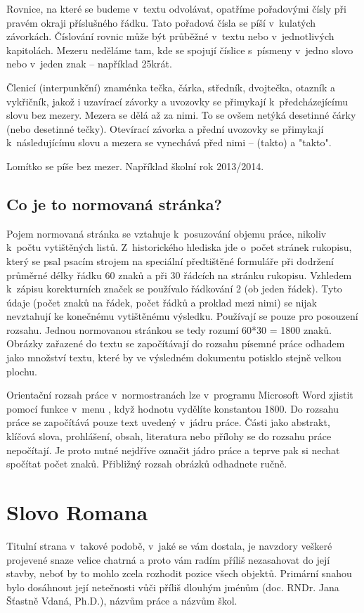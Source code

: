 \documentclass{template/socthesis}
\begin{document}
Rovnice, na které se budeme v~textu odvolávat, opatříme pořadovými čísly při pravém okraji příslušného řádku.
Tato pořadová čísla se píší v~kulatých závorkách.
Číslování rovnic může být průběžné v~textu nebo v~jednotlivých kapitolách.
Mezeru neděláme tam, kde se spojují číslice s~písmeny v~jedno slovo nebo v~jeden znak – například 25krát.

Členicí (interpunkční) znaménka tečka, čárka, středník, dvojtečka, otazník a vykřičník, jakož i uzavírací závorky a uvozovky se přimykají k~předcházejícímu slovu bez mezery.
Mezera se dělá až za nimi.
To se ovšem netýká desetinné čárky (nebo desetinné tečky).
Otevírací závorka a přední uvozovky se přimykají k~následujícímu slovu a mezera se vynechává před nimi – (takto) a "takto".

Lomítko se píše bez mezer.
Například školní rok 2013/2014.

\section{Co je to normovaná stránka?}
Pojem normovaná stránka se vztahuje k~posuzování objemu práce, nikoliv k~počtu vytištěných listů.
Z~historického hlediska jde o~počet stránek rukopisu, který se psal psacím strojem na speciální předtištěné formuláře při dodržení průměrné délky řádku 60 znaků a při 30 řádcích na stránku rukopisu.
Vzhledem k~zápisu korekturních značek se používalo řádkování 2 (ob jeden řádek).
Tyto údaje (počet znaků na řádek, počet řádků a proklad mezi nimi) se nijak nevztahují ke konečnému vytištěnému výsledku.
Používají se pouze pro posouzení rozsahu.
Jednou normovanou stránkou se tedy rozumí 60*30 = 1800 znaků.
Obrázky zařazené do textu se započítávají do rozsahu písemné práce odhadem jako množství textu, které by ve výsledném dokumentu potisklo stejně velkou plochu.

Orientační rozsah práce v~normostranách lze v~programu Microsoft Word zjistit pomocí funkce  v~menu , když hodnotu  vydělíte konstantou 1800.
Do rozsahu práce se započítává pouze text uvedený v~jádru práce.
Části jako abstrakt, klíčová slova, prohlášení, obsah, literatura nebo přílohy se do rozsahu práce nepočítají.
Je proto nutné nejdříve označit jádro práce a teprve pak si nechat spočítat počet znaků.
Přibližný rozsah obrázků odhadnete ručně.

\chapter{Slovo Romana}
Titulní strana v~takové podobě, v~jaké se vám dostala, je navzdory veškeré projevené snaze velice chatrná a proto vám radím příliš nezasahovat do její stavby, neboť by to mohlo zcela rozhodit pozice všech objektů.
Primární snahou bylo dosáhnout její netečnosti vůči příliš dlouhým jménům (doc.
RNDr.
Jana Šťastně Vdaná, Ph.D.), názvům práce a názvům škol.
\end{document}
